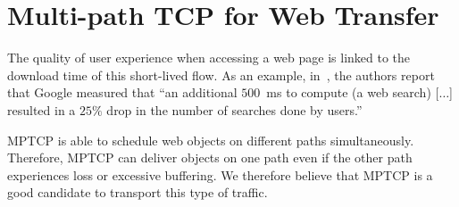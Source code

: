 \section{Multi-path TCP for Web Transfer}
\label{sec:transports}
The quality of user experience when accessing a web page is linked to the
download time of this short-lived flow. As an example,
in~\cite{why-latency-matters-2013}, the authors report that Google measured that
``an additional $500$~ms to compute (a web search) [$\ldots$] resulted in a
$25\%$ drop in the number of searches done by users.''

MPTCP is able to schedule web objects on different paths simultaneously.
Therefore, MPTCP can deliver objects on one path even if the other path
experiences loss or excessive buffering. We therefore believe that MPTCP is a
good candidate to transport this type of traffic.



